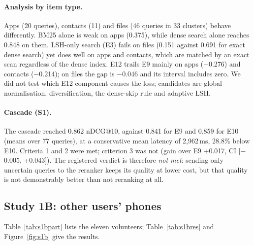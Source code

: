 \documentclass[pdflatex,sn-basic,Numbered]{sn-jnl}
\makeatletter
\newcommand{\ndcg}{nDCG@10}
\makeatother
\begin{document}
\paragraph{Analysis by item type.} Apps (20 queries), contacts (11) and files (46 queries in 33 clusters) behave differently. BM25 alone is weak on apps (0.375), while dense search alone reaches 0.848 on them. LSH-only search (E3) fails on files (0.151 against 0.691 for exact dense search) yet does well on apps and contacts, which are matched by an exact scan regardless of the dense index. E12 trails E9 mainly on apps ($-$0.276) and contacts ($-$0.214); on files the gap is $-$0.046 and its interval includes zero. We did not test which E12 component causes the loss; candidates are global normalisation, diversification, the dense-skip rule and adaptive LSH.

\paragraph{Cascade (S1).} The cascade reached 0.862 \ndcg{}, against 0.841 for E9 and 0.859 for E10 (means over 77 queries), at a conservative mean latency of 2,962\,ms, 28.8\% below E10. Criteria 1 and 2 were met; criterion 3 was not (gain over E9 +0.017, CI [$-$0.005, +0.043]). The registered verdict is therefore \emph{not met}: sending only uncertain queries to the reranker keeps its quality at lower cost, but that quality is not demonstrably better than not reranking at all.

\subsection{Study 1B: other users' phones}\label{sec:s1bres}

Table~\ref{tab:s1bpart} lists the eleven volunteers; Table~\ref{tab:s1bres} and Figure~\ref{fig:s1b} give the results.
\end{document}
